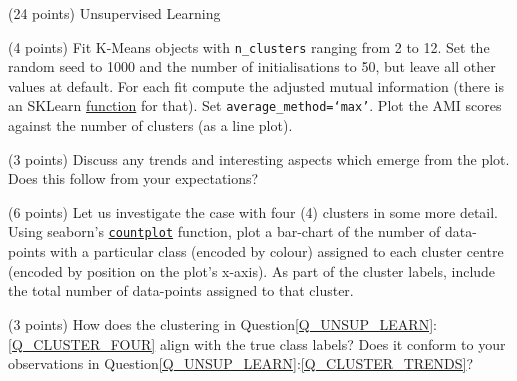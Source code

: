 \documentclass[12pt]{article}
\begin{document}
\begin{question}{\label{Q_UNSUP_LEARN}(24 points) Unsupervised Learning}
\begin{subquestion}{(4 points) Fit K-Means objects with \texttt{n\_clusters} ranging from 2 to 12. Set the random seed to 1000 and the number of initialisations to 50, but leave all other values at default. For each fit compute the adjusted mutual information (there is an SKLearn \href{https://scikit-learn.org/stable/modules/generated/sklearn.metrics.adjusted_mutual_info_score.html}{function} for that). Set \texttt{average\_method=`max'}. Plot the AMI scores against the number of clusters (as a line plot).}






\end{subquestion}

\begin{subquestion}{\label{Q_CLUSTER_TRENDS}(3 points) Discuss any trends and interesting aspects which emerge from the plot. Does this follow from your expectations?}






\end{subquestion}

\begin{subquestion}{\label{Q_CLUSTER_FOUR}(6 points) Let us investigate the case with four (4) clusters in some more detail. Using seaborn's \href{https://seaborn.pydata.org/generated/seaborn.countplot.html}{\texttt{countplot}} function, plot a bar-chart of the number of data-points with a particular class (encoded by colour) assigned to each cluster centre (encoded by position on the plot's x-axis). As part of the cluster labels, include the total number of data-points assigned to that cluster.}






\end{subquestion}

\begin{subquestion}{(3 points) How does the clustering in Question\ref{Q_UNSUP_LEARN}:\ref{Q_CLUSTER_FOUR} align with the true class labels? Does it conform to your observations in Question\ref{Q_UNSUP_LEARN}:\ref{Q_CLUSTER_TRENDS}?}






\end{subquestion}



\end{question}
\end{document}

